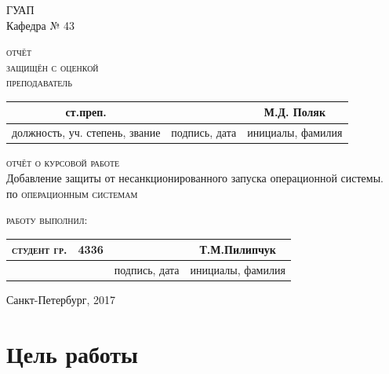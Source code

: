 \documentclass[a4paper]{article}
\begin{document}
 
\begin{center}
\hfill \break
\large{ГУАП}\\
\hfill \break
\normalsize{Кафедра № 43}\\
\hfill\break
\hfill \break
\begin{flushleft}
\textsc{отчёт}\\
\textsc{защищён с оценкой}\\
\textsc{преподаватель}\\
\end{flushleft}
\renewcommand{\arraystretch}{1} %
\renewcommand{\tabcolsep}{1cm}
\begin{center}
\begin{tabular}{ccc}
ст.преп. &  & М.Д. Поляк\\
\hline
\small{должность, уч. степень, звание} & \small{подпись, дата} & \small{инициалы, фамилия} \\
\hline
\end{tabular}
\end{center}
\hfill \break
\hfill \break
\textsc{отчёт о курсовой работе}\\
\hfill \break
\hfill \break
\hfill \break
\large{Добавление защиты от несанкционированного запуска операционной системы.}\\
\hfill \break
\hfill \break
\hfill \break
по \textsc{операционным системам}\\
\hfill \break
\hfill \break
\hfill \break
\begin{flushleft}
\textsc{работу выполнил:}
\end{flushleft}
\renewcommand{\arraystretch}{1} %
\renewcommand{\tabcolsep}{0,6cm}
\begin{tabular}{cccc}
\textsc{студент гр.} & 4336 & & Т.М.Пилипчук \\
\hline
& & \small{подпись, дата} & \small{инициалы, фамилия} \\
\end{tabular}
\end{center}
\hfill \break
\hfill \break
\begin{center} Санкт-Петербург, 2017 \end{center}
\thispagestyle{empty} %
 
 
\newpage

\section{Цель работы}
\end{document}

